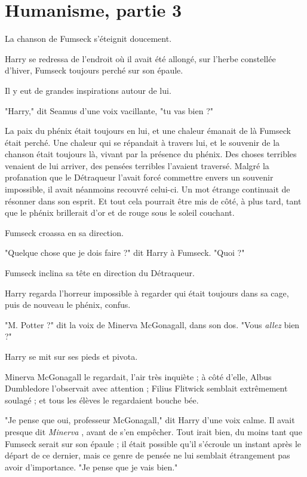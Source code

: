 
\chapter{Humanisme, partie 3}

La chanson de Fumseck s'éteignit doucement.

Harry se redressa de l'endroit où il avait été allongé, sur l'herbe constellée d'hiver, Fumseck toujours perché sur son épaule.

Il y eut de grandes inspirations autour de lui.

"Harry," dit Seamus d'une voix vacillante, "tu vas bien ?"

La paix du phénix était toujours en lui, et une chaleur émanait de là Fumseck était perché. Une chaleur qui se répandait à travers lui, et le souvenir de la chanson était toujours là, vivant par la présence du phénix. Des choses terribles venaient de lui arriver, des pensées terribles l'avaient traversé. Malgré la profanation que le Détraqueur l'avait forcé commettre envers un souvenir impossible, il avait néanmoins recouvré celui-ci. Un mot étrange continuait de résonner dans son esprit. Et tout cela pourrait être mis de côté, à plus tard, tant que le phénix brillerait d'or et de rouge sous le soleil couchant.

Fumseck croassa en sa direction.

"Quelque chose que je dois faire ?" dit Harry à Fumseck. "Quoi ?"

Fumseck inclina sa tête en direction du Détraqueur.

Harry regarda l'horreur impossible à regarder qui était toujours dans sa cage, puis de nouveau le phénix, confus.

"M. Potter ?" dit la voix de Minerva McGonagall, dans son dos. "Vous \emph{allez}  bien ?"

Harry se mit sur ses pieds et pivota.

Minerva McGonagall le regardait, l'air très inquiète ; à côté d'elle, Albus Dumbledore l'observait avec attention ; Filius Flitwick semblait extrêmement soulagé ; et tous les élèves le regardaient bouche bée.

"Je pense que oui, professeur McGonagall," dit Harry d'une voix calme. Il avait presque dit \emph{Minerva} , avant de s'en empêcher. Tout irait bien, du moins tant que Fumseck serait sur son épaule ; il était possible qu'il s'écroule un instant après le départ de ce dernier, mais ce genre de pensée ne lui semblait étrangement pas avoir d'importance. "Je pense que je vais bien."

